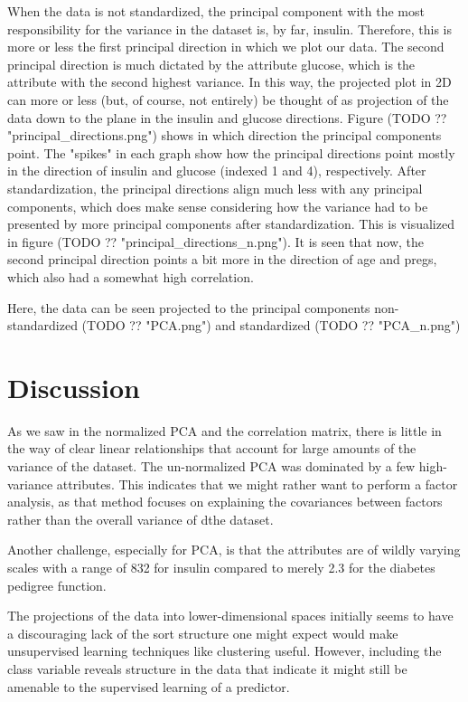 When the data is not standardized, the principal component with the most
responsibility for the variance in the dataset is, by far, insulin. Therefore,
this is more or less the first principal direction in which we plot our data. The second
principal direction is much dictated by the attribute glucose, which is the
attribute with the second highest variance. In this way, the projected plot in
2D can more or less (but, of course, not entirely) be thought of as
projection of the data down to the plane in the insulin and glucose directions.
Figure (TODO ?? "principal\_directions.png") shows in which direction the principal components point. The "spikes"
in each graph show how the principal directions point mostly in the direction of
insulin and glucose (indexed 1 and 4), respectively. After standardization, the principal
directions align much less with any principal components, which does make sense
considering how the variance had to be presented by more principal components
after standardization. This is visualized in figure (TODO ?? "principal\_directions\_n.png").
It is seen that now, the second principal direction points a bit more in the direction
of age and pregs, which also had a somewhat high correlation.

Here, the data can be seen projected to the principal components non-standardized
(TODO ?? "PCA.png") and standardized (TODO ?? "PCA\_n.png")

\section{Discussion}
As we saw in the normalized PCA and the correlation matrix,
there is little in the way of clear
linear relationships that account for
large amounts of the variance of the dataset.
The un-normalized PCA was dominated by a few high-variance attributes.
This indicates that we might rather want to perform a factor analysis,
as that method focuses on explaining the covariances between factors rather
than the overall variance of dthe dataset.

Another challenge,
especially for PCA,
is that the attributes are of wildly varying scales
with a range of 832 for insulin compared to merely 2.3
for the diabetes pedigree function.

The projections of the data into lower-dimensional spaces
initially seems to have a discouraging lack of the sort structure
one might expect would make unsupervised learning techniques like clustering useful.
However, including the class variable reveals structure in the data
that indicate it might still be amenable to
the supervised learning of a predictor.

